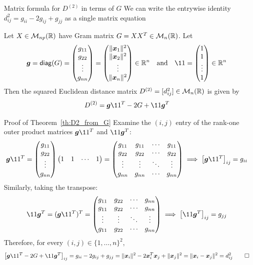 \documentclass[aspectratio=169]{beamer}\usepackage[]{graphicx}\usepackage[]{xcolor}
\begin{document}
\begin{frame}{Matrix formula for $D^{(2)}$ in terms of $G$}
We can write the entrywise identity $d_{ij}^2 = g_{ii} - 2g_{ij} + g_{jj}$ as a single matrix equation
\vfill
\begin{theorem}
\label{th:D2_from_G}
Let $X\in\mathcal{M}_{np}(\mathbb{R})$ have Gram matrix $G = XX^T\in\mathcal{M}_n(\mathbb{R})$. Let
\[
\bg = \diag(G) = \begin{pmatrix} g_{11} \\ g_{22} \\ \vdots \\ g_{nn} \end{pmatrix} = \begin{pmatrix} \|\bx_1\|^2 \\ \|\bx_2\|^2 \\ \vdots \\ \|\bx_n\|^2 \end{pmatrix} \in \IR^n
\quad\text{and}\quad
\11 = \begin{pmatrix} 1 \\ 1 \\ \vdots \\ 1 \end{pmatrix} \in \IR^n
\]
Then the squared Euclidean distance matrix $D^{(2)} = [d_{ij}^2]\in\mathcal{M}_n(\mathbb{R})$ is given by
\[
D^{(2)} = \bg\11^T - 2G + \11\bg^T
\]
\end{theorem}
\end{frame}

\begin{frame}{Proof of Theorem~\ref{th:D2_from_G}}
Examine the $(i,j)$ entry of the rank-one outer product matrices $\bg\11^T$ and $\11\bg^T$:
\vfill
\[
\bg\11^T = \begin{pmatrix} g_{11} \\ g_{22} \\ \vdots \\ g_{nn} \end{pmatrix} \begin{pmatrix} 1 & 1 & \cdots & 1 \end{pmatrix}
= \begin{pmatrix}
g_{11} & g_{11} & \cdots & g_{11} \\
g_{22} & g_{22} & \cdots & g_{22} \\
\vdots & \vdots & \ddots & \vdots \\
g_{nn} & g_{nn} & \cdots & g_{nn}
\end{pmatrix}
\implies \big[\bg\11^T\big]_{ij} = g_{ii}
\]
\vfill
Similarly, taking the transpose:
\[
\11\bg^T = (\bg\11^T)^T = \begin{pmatrix}
g_{11} & g_{22} & \cdots & g_{nn} \\
g_{11} & g_{22} & \cdots & g_{nn} \\
\vdots & \vdots & \ddots & \vdots \\
g_{11} & g_{22} & \cdots & g_{nn}
\end{pmatrix}
\implies \big[\11\bg^T\big]_{ij} = g_{jj}
\]
\vfill
Therefore, for every $(i,j)\in\{1,\ldots,n\}^2$,
\[
\big[\bg\11^T - 2G + \11\bg^T\big]_{ij} = g_{ii} - 2g_{ij} + g_{jj} = \|\bx_i\|^2 - 2\bx_i^T\bx_j + \|\bx_j\|^2 = \|\bx_i - \bx_j\|^2 = d_{ij}^2 \hfill\qed
\]
\end{frame}
\end{document}

